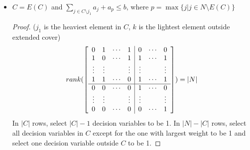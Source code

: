 \begin{itemize}
                        \item $C = E(C)$ and $\sum_{j\in C \setminus j_1} a_j + a_p \le b$, where $p = \max\{j | j\in N \setminus E(C)\}$
                            \begin{proof}
                                ($j_1$ is the heaviest element in $C$, $k$ is the lightest element outside extended cover)
                                \begin{equation*}
                                    rank(\left[\begin{array}{c c c c | c c c}
                                        0 & 1 & \cdots & 1 & 0 & \cdots & 0 \\
                                        1 & 0 & \cdots & 1 & 1 & \cdots & 1 \\
                                        \vdots & \vdots & & \vdots & \vdots & & \vdots\\
                                        1 & 1 & \cdots & 0 & 1 & \cdots & 1 \\
                                        \hline
                                        0 & 0 & \cdots & 0 & 1 & \cdots & 0 \\
                                        \vdots & \vdots & & \vdots & \vdots & & \vdots\\
                                        0 & 0 & \cdots & 0 & 0 & \cdots & 1
                                        \end{array}\right]) = |N|
                                \end{equation*}
                                In $|C|$ rows, select $|C| - 1$ decision variables to be 1. In $|N| - |C|$ rows, select all decision variables in $C$ except for the one with largest weight to be 1 and select one decision variable outside $C$ to be 1.
                            \end{proof}


\end{itemize}
